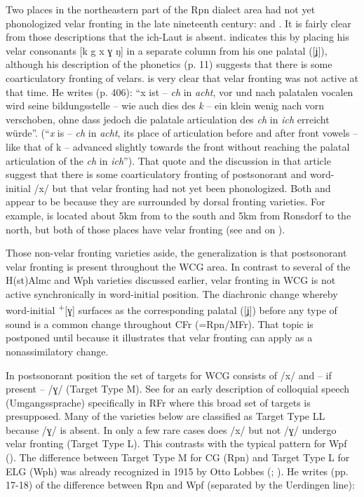 Two places in the northeastern part of the Rpn dialect area had not yet phonologized velar fronting in the late nineteenth century:  \citep{Maurmann1889} and  \citep{Holthausen1885, Holthausen1885b}. It is fairly clear from those descriptions that the ich-Laut is absent. \citet[10]{Maurmann1889} indicates this by placing his velar consonants [k g x ɣ ŋ] in a separate column from his one palatal ([ʝ]), although his description of the phonetics (p. 11) suggests that there is some coarticulatory fronting of velars. \citet{Holthausen1885} is very clear that velar fronting was not active at that time. He writes (p. 406): “x ist -- \textit{ch} in \textit{acht}, vor und nach palatalen vocalen wird seine bildungsstelle -- wie auch dies des \textit{k} -- ein klein wenig nach vorn verschoben, ohne dass jedoch die palatale articulation des \textit{ch} in \textit{ich} erreicht würde”.  (“\textit{x} is -- \textit{ch} in \textit{acht}, its place of articulation before and after front vowels -- like that of k -- advanced  slightly towards the front without reaching the palatal articulation of the \textit{ch} in \textit{ich}”). That quote and the discussion in that article suggest that there is some coarticulatory fronting of postsonorant and word-initial /x/ but that velar fronting had not yet been phonologized. Both  and  appear to be  because they are surrounded by dorsal fronting varieties. For example,  is located about 5km from  to the south and 5km from Ronsdorf to the north, but both of those places have velar fronting (see \citealt{Holthaus1887} and \citealt{Hasenclever1905} on ).

Those non-velar fronting varieties aside, the generalization is that postsonorant velar fronting is present throughout the WCG area. In contrast to several of the H(st)Almc and Wph varieties discussed earlier, velar fronting in WCG is not active synchronically in word-initial position. The diachronic change whereby word-initial \textsuperscript{+}[ɣ] surfaces as the corresponding palatal ([ʝ]) before any type of sound is a common change throughout CFr (=Rpn/MFr). That topic is postponed until  because it illustrates that velar fronting can apply as a nonassimilatory change.

In postsonorant position the set of targets for WCG consists of /x/ and -- if present -- /ɣ/  (Target Type M). See \citet[7]{Viëtor1875} for an  early description of colloquial speech (Umgangssprache) specifically in RFr where this broad set of targets is presupposed. Many of the varieties below are classified as Target Type LL because /ɣ/ is absent. In only a few rare cases does /x/ but not /ɣ/ undergo velar fronting (Target Type L). This contrasts with the typical pattern for Wpf (). The difference between Target Type M for CG (Rpn) and Target Type L for ELG (Wph) was already recognized in 1915 by Otto Lobbes (\citealt{Lobbes1915}; ). He writes (pp. 17-18) of the difference between Rpn and Wpf (separated by the Uerdingen line):

